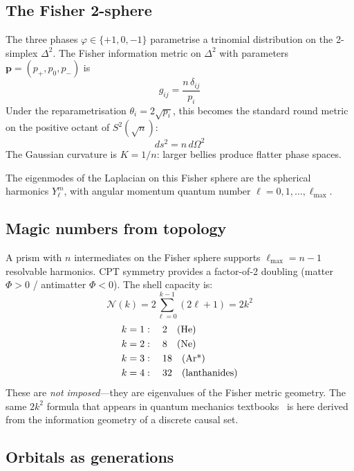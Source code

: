 \documentclass[aps,prd,twocolumn,superscriptaddress,nofootinbib,amsmath,amssymb,longbibliography]{revtex4-2}
\begin{document}
\subsection{The Fisher 2-sphere}

The three phases $\varphi \in \{+1, 0, -1\}$ parametrise a trinomial
distribution on the 2-simplex $\Delta^2$.
The Fisher information metric on $\Delta^2$ with parameters
$\bm{p} = (p_+, p_0, p_-)$ is~\cite{amari2000}
\begin{equation}
  g_{ij} = \frac{n\,\delta_{ij}}{p_i}
\end{equation}
Under the reparametrisation $\theta_i = 2\sqrt{p_i}$, this becomes
the standard round metric on the positive octant of $S^2(\sqrt{n})$:
\begin{equation}
  ds^2 = n\,d\Omega^2
\end{equation}
The Gaussian curvature is $K = 1/n$: larger bellies produce flatter
phase spaces.

The eigenmodes of the Laplacian on this Fisher sphere are the
spherical harmonics $Y_\ell^m$, with angular momentum quantum number
$\ell = 0, 1, \ldots, \ell_{\max}$.

\subsection{Magic numbers from topology}

A prism with $n$ intermediates on the Fisher sphere supports
$\ell_{\max} = n - 1$ resolvable harmonics.
CPT symmetry provides a factor-of-2 doubling (matter $\Phi > 0$ /
antimatter $\Phi < 0$).
The shell capacity is:
\begin{equation}\label{eq:magic}
  \mathcal{N}(k) = 2\sum_{\ell=0}^{k-1}(2\ell + 1) = 2k^2
\end{equation}
\begin{align}
  k = 1&: \quad 2 \quad\text{(He)} \notag\\
  k = 2&: \quad 8 \quad\text{(Ne)} \notag\\
  k = 3&: \quad 18 \quad\text{(Ar*)} \notag\\
  k = 4&: \quad 32 \quad\text{(lanthanides)}
\end{align}
These are \emph{not imposed}---they are eigenvalues of the Fisher
metric geometry.  The same $2k^2$ formula that appears in quantum
mechanics textbooks~\cite{griffiths2018} is here derived from the
information geometry of a discrete causal set.

\subsection{Orbitals as generations}
\end{document}
